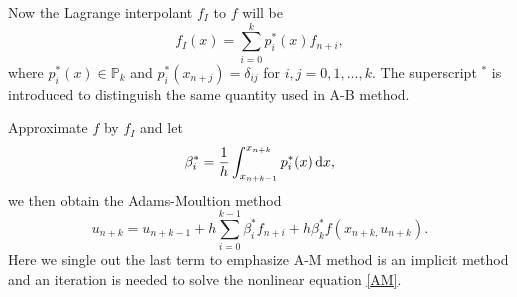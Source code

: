 \documentclass[10pt]{amsart}
\begin{document}
Now the Lagrange interpolant $f_I$ to $f$ will be 
$$
f_I(x) = \sum_{i=0}^{k}p_i^*(x) f_{n+i},
$$
where $p_i^*(x)\in \mathbb P_{k}$ and $p_i^*(x_{n+j}) = \delta_{ij}$ for $i,j=0,1,\ldots, k$. The superscript $^*$ is introduced to distinguish the same quantity used in A-B method.

Approximate $f$ by $f_I$ and let $$\beta_i^* = \frac{1}{h}\int_{x_{n+k-1}}^{x_{n+k}} p_i^*(x) \,{\rm d}x,$$ we then obtain the Adams-Moultion method
\begin{equation}\label{AM}
u_{n+k} = u_{n+k-1} + h \sum_{i=0}^{k-1}\beta_i^* f_{n+i} + h\beta_k^*f(x_{n+k,} u_{n+k}).
\end{equation}
Here we single out the last term to emphasize A-M method is an implicit method and an iteration is needed to solve the nonlinear equation \eqref{AM}. 




 
\end{document}
